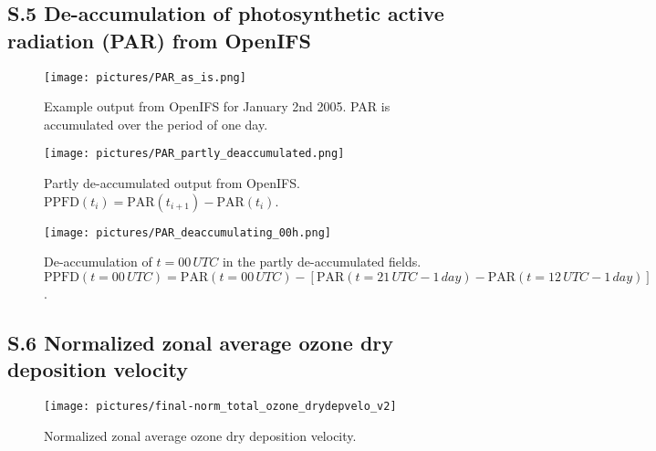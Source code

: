 \documentclass[manuscript]{copernicus}
\begin{document}
\subsection*{S.5 De-accumulation of photosynthetic active radiation (PAR) from OpenIFS}
\begin{figure}[!htbp]
  \centering
  \texttt{[image: pictures/PAR\_as\_is.png]}
  \caption{Example output from OpenIFS for January 2nd 2005. PAR is accumulated over the period of one day.}
\end{figure}

\begin{figure}[!htbp]
  \centering
  \texttt{[image: pictures/PAR\_partly\_deaccumulated.png]}
  \caption{Partly de-accumulated output from OpenIFS. $\text{PPFD}(t_i) = \text{PAR}(t_{i+1})-\text{PAR}(t_i)$.}
\end{figure}

\begin{figure}[!htbp]
  \centering
  \texttt{[image: pictures/PAR\_deaccumulating\_00h.png]}
  \caption{De-accumulation of $t=00\,\unit{UTC}$ in the partly de-accumulated fields. $\text{PPFD}(t=00\,\unit{UTC}) = \text{PAR}(t=00\,\unit{UTC}) - \left[\text{PAR}(t=21\,\unit{UTC}-1\,\unit{day})-\text{PAR}(t=12\,\unit{UTC}-1\,\unit{day})\right]$.}
\end{figure}

\subsection*{S.6 Normalized zonal average ozone dry deposition velocity}
\begin{figure}[!htbp]
  \centering
  \texttt{[image: pictures/final-norm\_total\_ozone\_drydepvelo\_v2]}
  \caption{Normalized zonal average ozone dry deposition velocity.}
\end{figure}
\end{document}
